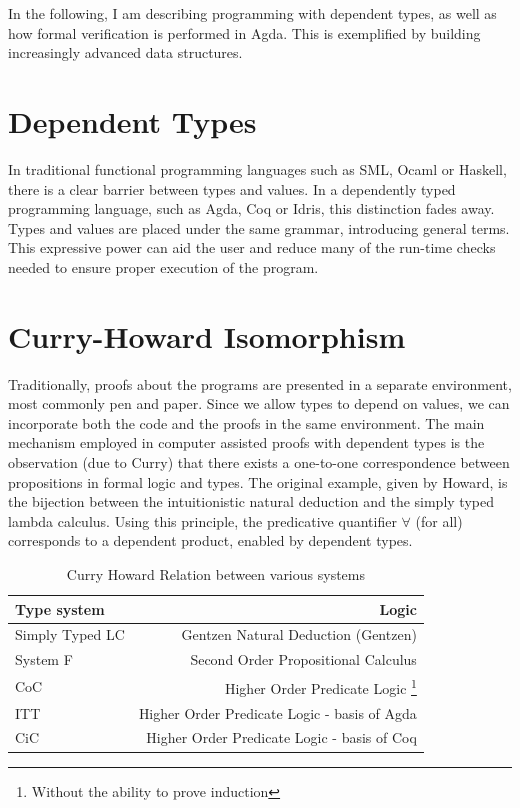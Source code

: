 \documentclass[12pt,twoside,notitlepage]{report}
\begin{document}
In the following, I am describing programming with dependent types, as well as how formal verification is performed in Agda. This is exemplified by building increasingly advanced data structures.

\section{Dependent Types} 

In traditional functional programming languages such as SML, Ocaml or Haskell, there is a clear barrier between types and values. In a dependently typed programming language, such as Agda, Coq or Idris, this distinction fades away. Types and values are placed under the same grammar, introducing general terms. 
This expressive power can aid the user and reduce many of the run-time checks needed to ensure proper execution of the program. 

\section{Curry-Howard Isomorphism}

Traditionally, proofs about the programs are presented in a separate environment, most commonly pen and paper. Since we allow types to depend on values, we can incorporate both the code and the proofs in the same environment. 
The main mechanism employed in computer assisted proofs with dependent types is the observation (due to Curry) that there exists a one-to-one correspondence between propositions in formal logic and types. The original example, given by Howard, is the bijection between the intuitionistic natural deduction and the simply typed lambda calculus.
Using this principle, the predicative quantifier $\forall$ (for all) corresponds to a dependent product, enabled by dependent types.

\begin{table}[h!]
\centering 
	\begin{tabular}{l r} 
	\hline
	Type system & Logic \\
	\hline 
	Simply Typed LC  & Gentzen Natural Deduction (Gentzen) \\
	System F & Second Order Propositional Calculus \\
	CoC &  Higher Order Predicate Logic \footnote{Without the ability to prove induction} \\
	ITT & Higher Order Predicate Logic - basis of Agda \\ 
	CiC & Higher Order Predicate Logic - basis of Coq \\   
	\hline 
	\end{tabular}
\caption{Curry Howard Relation between various systems}
\end{table}
\end{document}
